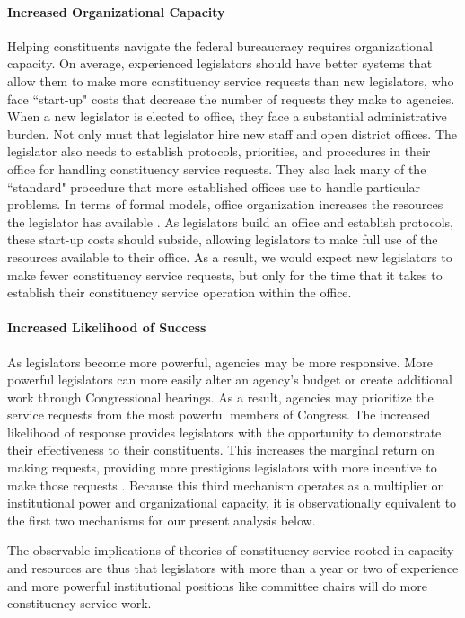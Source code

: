 \documentclass[12pt]{article}
\begin{document}
\paragraph{Increased Organizational Capacity} Helping constituents navigate the federal bureaucracy requires organizational capacity. On average, experienced legislators should have better systems that allow them to make more constituency service requests than new legislators, who face ``start-up" costs that decrease the number of requests they make to agencies. When a new legislator is elected to office, they face a substantial administrative burden. Not only must that legislator hire new staff and open district offices. The legislator also needs to establish protocols, priorities, and procedures in their office for handling constituency service requests. They also lack many of the ``standard" procedure that more established offices use to handle particular problems. In terms of formal models, office organization increases the resources the legislator has available \citep{AshworthBuenodeMesquita2006}. As legislators build an office and establish protocols, these start-up costs should subside, allowing legislators to make full use of the resources available to their office. As a result, we would expect new legislators to make fewer constituency service requests, but only for the time that it takes to establish their constituency service operation within the office.   


\paragraph{Increased Likelihood of Success} As legislators become more powerful, agencies may be more responsive. More powerful legislators can more easily alter an agency's budget or create additional work through Congressional hearings. As a result, agencies may prioritize the service requests from the most powerful members of Congress. %
The increased likelihood of response provides legislators with the opportunity to demonstrate their effectiveness to their constituents. This increases the marginal return on making requests, providing more prestigious legislators with more incentive to make those requests \citep{CainFerejohnFiorina1987}.  Because this third mechanism operates as a multiplier on institutional power and organizational capacity, it is observationally equivalent to the first two mechanisms for our present analysis below.

The observable implications of theories of constituency service rooted in capacity and resources are thus that legislators with more than a year or two of experience and more powerful institutional positions like committee chairs will do more constituency service work.
\end{document}
